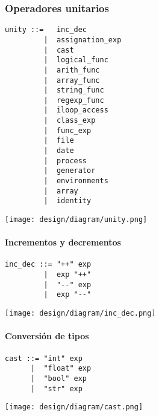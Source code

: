 \pagebreak
\subsubsection{Operadores unitarios}
\begin{multicols}{2}
\begin{lstlisting}[style=nonumbers]      
unity ::=   inc_dec
         |  assignation_exp
         |  cast
         |  logical_func
         |  arith_func
         |  array_func
         |  string_func
         |  regexp_func
         |  iloop_access
         |  class_exp
         |  func_exp
         |  file
         |  date
         |  process
         |  generator
         |  environments
         |  array
         |  identity
\end{lstlisting}  
\columnbreak	
\begin{center}
\texttt{[image: design/diagram/unity.png]} 
\end{center}
\end{multicols}

\paragraph{Incrementos y decrementos}
\begin{multicols}{2}
\begin{lstlisting}[style=nonumbers]      
inc_dec ::= "++" exp
         |  exp "++"
         |  "--" exp
         |  exp "--"
\end{lstlisting}  
\columnbreak	
\begin{center}
\texttt{[image: design/diagram/inc\_dec.png]} 
\end{center}
\end{multicols}
\pagebreak
\paragraph{Conversión de tipos}
\begin{multicols}{2}
\begin{lstlisting}[style=nonumbers]      
cast ::= "int" exp
      |  "float" exp
      |  "bool" exp
      |  "str" exp
\end{lstlisting}  
\columnbreak	
\begin{center}
\texttt{[image: design/diagram/cast.png]} 
\end{center}
\end{multicols}



